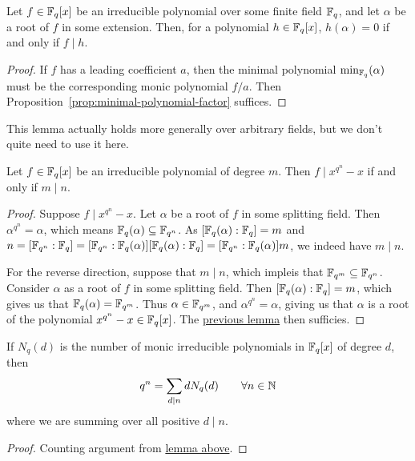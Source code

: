 \begin{lemma}\label{lem:extension-polynomial-divides}
    Let \(f \in \mathbb{F}_q[x]\) be an irreducible polynomial over some finite field \(\mathbb{F}_q\),
    and let \(\alpha\) be a root of \(f\) in some extension.
    Then, for a polynomial \(h \in \mathbb{F}_q[x]\),
    \(h(\alpha) = 0\) if and only if \(f \mid h\).
\end{lemma}
\begin{proof}
    If \(f\) has a leading coefficient \(a\),
    then the minimal polynomial \(\min_{\mathbb{F}_q}(\alpha)\)
    must be the corresponding monic polynomial \(f/a\).
    Then Proposition~\ref{prop:minimal-polynomial-factor} suffices.
\end{proof}
\begin{remark}
    This lemma actually holds more generally over arbitrary fields,
    but we don't quite need to use it here.
\end{remark}
\begin{lemma}\label{lem:factor-divisibility}
    Let \(f \in \mathbb{F}_q[x]\) be an irreducible polynomial of degree \(m\).
    Then \(f \mid x^{q^n} - x\) if and only if \(m \mid n\).
\end{lemma}
\begin{proof}
    Suppose \(f \mid x^{q^n} - x\).
    Let \(\alpha\) be a root of \(f\) in some splitting field.
    Then \(\alpha^{q^n} = \alpha\), which means \(\mathbb{F}_q(\alpha) \subseteq \mathbb{F}_{q^n}\).
    As \([\mathbb{F}_q(\alpha):\mathbb{F}_q] = m\)
    and \(n = [\mathbb{F}_{q^n}:\mathbb{F}_q] = [\mathbb{F}_{q^n}:\mathbb{F}_q(\alpha)][\mathbb{F}_q(\alpha):\mathbb{F}_q] = [\mathbb{F}_{q^n}:\mathbb{F}_q(\alpha)]m\),
    we indeed have \(m \mid n\).

    For the reverse direction, suppose that \(m \mid n\),
    which impleis that \(\mathbb{F}_{q^m} \subseteq \mathbb{F}_{q^n}\).
    Consider \(\alpha\) as a root of \(f\) in some splitting field.
    Then \([\mathbb{F}_q(\alpha):\mathbb{F}_q] = m\), which gives us that \(\mathbb{F}_q(\alpha) = \mathbb{F}_{q^m}\).
    Thus \(\alpha \in \mathbb{F}_{q^m}\), and \(\alpha^{q^n} = \alpha\),
    giving us that \(\alpha\) is a root of the polynomial \(x^{q^n} - x \in \mathbb{F}_q[x]\).
    The \hyperref[lem:extension-polynomial-divides]{previous lemma} then sufficies.
\end{proof}
\begin{corollary}
    If \(N_q(d)\) is the number of monic irreducible polynomials
    in \(\mathbb{F}_q[x]\) of degree \(d\), then
    \begin{equation*}
        q^n = \sum_{d \mid n} d N_q(d) \qquad \forall n \in \mathbb{N}
    \end{equation*}
    where we are summing over all positive \(d \mid n\).
\end{corollary}
\begin{proof}
    Counting argument from \hyperref[lem:factor-divisibility]{lemma above}.
\end{proof}
